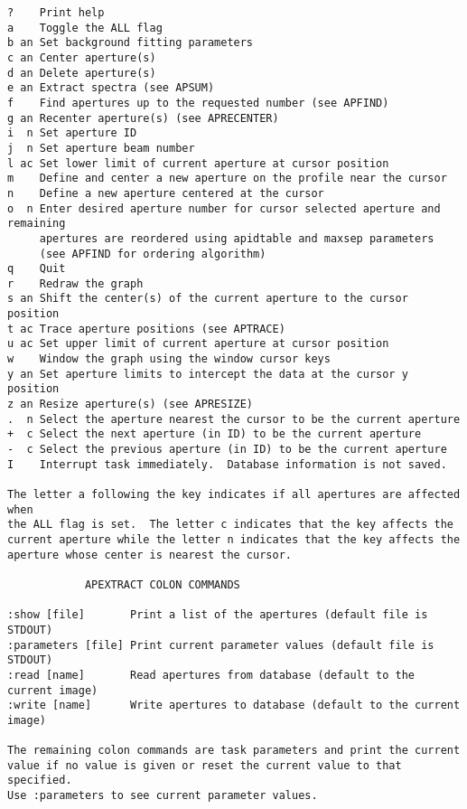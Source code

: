 \begin{verbatim}
?    Print help
a    Toggle the ALL flag
b an Set background fitting parameters
c an Center aperture(s)
d an Delete aperture(s)
e an Extract spectra (see APSUM)
f    Find apertures up to the requested number (see APFIND)
g an Recenter aperture(s) (see APRECENTER)
i  n Set aperture ID
j  n Set aperture beam number
l ac Set lower limit of current aperture at cursor position
m    Define and center a new aperture on the profile near the cursor
n    Define a new aperture centered at the cursor
o  n Enter desired aperture number for cursor selected aperture and remaining
     apertures are reordered using apidtable and maxsep parameters
     (see APFIND for ordering algorithm)
q    Quit
r    Redraw the graph
s an Shift the center(s) of the current aperture to the cursor position
t ac Trace aperture positions (see APTRACE)
u ac Set upper limit of current aperture at cursor position
w    Window the graph using the window cursor keys
y an Set aperture limits to intercept the data at the cursor y position
z an Resize aperture(s) (see APRESIZE)
.  n Select the aperture nearest the cursor to be the current aperture
+  c Select the next aperture (in ID) to be the current aperture
-  c Select the previous aperture (in ID) to be the current aperture
I    Interrupt task immediately.  Database information is not saved.

The letter a following the key indicates if all apertures are affected when
the ALL flag is set.  The letter c indicates that the key affects the
current aperture while the letter n indicates that the key affects the
aperture whose center is nearest the cursor.

			APEXTRACT COLON COMMANDS

:show [file]	   Print a list of the apertures (default file is STDOUT)
:parameters [file] Print current parameter values (default file is STDOUT)
:read [name]       Read apertures from database (default to the current image)
:write [name]      Write apertures to database (default to the current image)

The remaining colon commands are task parameters and print the current
value if no value is given or reset the current value to that specified.
Use :parameters to see current parameter values.
\end{verbatim}
\endgroup

